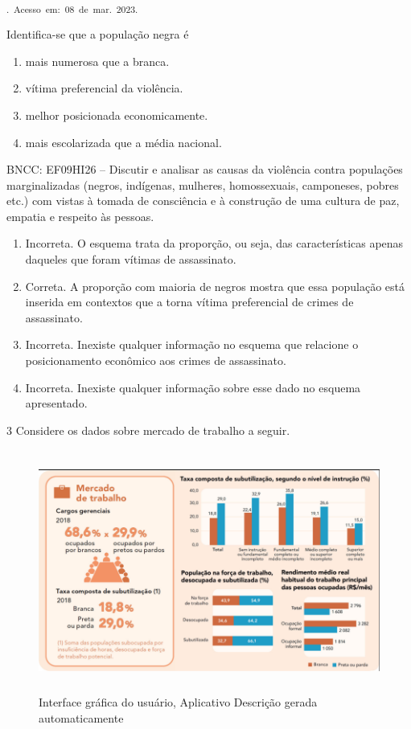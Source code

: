 \textsubscript{.~Acesso~em:~08~de~mar.~2023.}

Identifica-se que a população negra é

\begin{enumerate}
\def\labelenumi{\alph{enumi})}
\item
  mais numerosa que a branca.
\item
  vítima preferencial da violência.
\item
  melhor posicionada economicamente.
\item
  mais escolarizada que a média nacional.
\end{enumerate}

BNCC: EF09HI26 -- Discutir e analisar as causas da violência contra
populações marginalizadas (negros, indígenas, mulheres, homossexuais,
camponeses, pobres etc.) com vistas à tomada de consciência e à
construção de uma cultura de paz, empatia e respeito às pessoas.

\begin{enumerate}
\def\labelenumi{\alph{enumi})}
\item
  Incorreta. O esquema trata da proporção, ou seja, das características
  apenas daqueles que foram vítimas de assassinato.
\item
  Correta. A proporção com maioria de negros mostra que essa população
  está inserida em contextos que a torna vítima preferencial de crimes
  de assassinato.
\item
  Incorreta. Inexiste qualquer informação no esquema que relacione o
  posicionamento econômico aos crimes de assassinato.
\item
  Incorreta. Inexiste qualquer informação sobre esse dado no esquema
  apresentado.
\end{enumerate}

\num{3} Considere os dados sobre mercado de trabalho a seguir.

\begin{figure}
\centering
\includegraphics[width=5.27586in,height=3.12929in]{./imgSAEB_9_CHUM3/media/image3.png}
\caption{Interface gráfica do usuário, Aplicativo Descrição gerada
automaticamente}
\end{figure}

